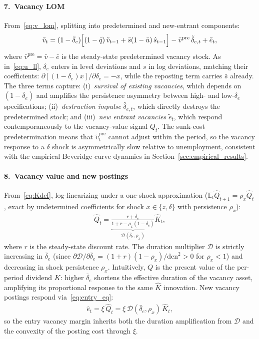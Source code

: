 \documentclass[authoryear, review, 12pt]{elsarticle}
\begin{document}
\paragraph{7.\ Vacancy LOM}
From~\eqref{eq:v_lom}, splitting into predetermined and new-entrant
components:
\begin{align}\label{eq:v_ll}
    \tilde{v}_t
    = (1-\bar\delta_e)\Bigl[(1-\bar{q})\,\tilde{v}_{t-1}
      + \bar{s}(1-\bar{u})\,\hat{s}_{t-1}\Bigr]
    - \bar{v}^{\mathrm{pre}}\,\tilde\delta_{e,t}
    + \tilde{e}_t,
\end{align}
where $\bar{v}^{\mathrm{pre}} = \bar{v}-\bar{e}$ is the steady-state predetermined vacancy stock.
As in~\eqref{eq:u_ll}, $\delta_e$ enters in level deviations and $s$ in log
deviations, matching their coefficients: $\partial[(1-\delta_e)x]/\partial\delta_e
=-x$, while the reposting term carries $\bar{s}$ already.
The three terms capture: (i)~\emph{survival of existing vacancies}, which
depends on $(1-\bar\delta_e)$ and amplifies the persistence asymmetry
between high- and low-$\delta_e$ specifications; (ii)~\emph{destruction
impulse} $\hat\delta_{e,t}$, which directly destroys the predetermined stock;
and (iii)~\emph{new entrant vacancies} $\tilde{e}_t$, which respond
contemporaneously to the vacancy-value signal $Q_t$.
The sunk-cost predetermination means that $\tilde{v}_t^{\mathrm{pre}}$
cannot adjust within the period, so the vacancy response to a $\delta$ shock
is asymmetrically slow relative to unemployment, consistent with the
empirical Beveridge curve dynamics in Section~\ref{sec:empirical_results}.

\paragraph{8.\ Vacancy value and new postings}
From~\eqref{eq:Kdef}, log-linearizing under a one-shock approximation
($\mathbb{E}_t\hat{Q}_{t+1}=\rho_x\hat{Q}_t$, exact by undetermined
coefficients for shock $x\in\{z,\delta\}$ with persistence $\rho_x$):
\begin{align}\label{eq:Q_ll2}
    \hat{Q}_t
    = \underbrace{\frac{r+\bar\delta_e}{1+r-\rho_x(1-\bar\delta_e)}}_{\displaystyle\mathcal{D}(\bar\delta_e,\rho_x)}\hat{K}_t,
\end{align}
where $r$ is the steady-state discount rate.  The duration multiplier
$\mathcal{D}$ is strictly increasing in $\bar\delta_e$ (since
$\partial\mathcal{D}/\partial\bar\delta_e = (1+r)(1-\rho_x)/\mathrm{den}^2>0$
for $\rho_x<1$) and decreasing in shock persistence $\rho_x$.
Intuitively, $Q$ is the present value of the per-period dividend $K$: higher
$\bar\delta_e$ shortens the effective duration of the vacancy asset,
amplifying its proportional response to the same $\hat{K}$ innovation.
New vacancy postings respond via~\eqref{eq:entry_eq}:
\begin{align}\label{eq:e_ll}
    \hat{e}_t = \xi\,\hat{Q}_t = \xi\,\mathcal{D}(\bar\delta_e,\rho_x)\,\hat{K}_t,
\end{align}
so the entry vacancy margin inherits both the duration amplification from
$\mathcal{D}$ and the convexity of the posting cost through $\xi$.
\end{document}
